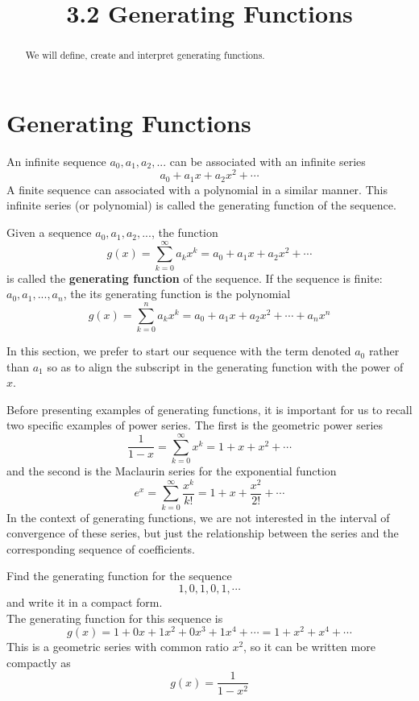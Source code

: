 \documentclass[handout]{ximera}
\title{3.2 Generating Functions}
\begin{document}
\begin{abstract}
We will define, create and interpret generating functions.
\end{abstract}

\maketitle

\section{Generating Functions}

An infinite sequence $a_0, a_1, a_2, ... $ can be associated with an infinite series
\[
a_0 + a_1 x + a_2 x^2 + \cdots
\]
A finite sequence can associated with a polynomial in a similar manner.
This infinite series (or polynomial) is called the generating function of the sequence.
\begin{definition}
Given a sequence $a_0, a_1, a_2, ...$, the function 
\[
g(x) = \sum_{k=0}^\infty a_kx^k = a_0 + a_1 x + a_2 x^2 + \cdots
\]
is called the \textbf{generating function} of the sequence.
If the sequence is finite: $a_0, a_1, ..., a_n$, the its generating function is the polynomial
\[
g(x) = \sum_{k=0}^n a_kx^k = a_0 + a_1 x + a_2 x^2 + \cdots + a_n x^n
\]
\end{definition}

\begin{remark}
In this section, we prefer to start our sequence with the term denoted $a_0$ rather than $a_1$ so as to 
align the subscript in the generating function with the power of $x$.
\end{remark}

Before presenting examples of generating functions, it is important for us to recall two specific examples of power series.
The first is the geometric power series
\[
\frac{1}{1-x} = \sum_{k=0}^\infty x^k = 1 + x + x^2 + \cdots
\]
and the second is the Maclaurin series for the exponential function
\[
e^x =  \sum_{k=0}^\infty \frac{x^k}{k!} = 1 + x + \frac{x^2}{2!} + \cdots
\]
In the context of generating functions, we are not interested in the interval of convergence of these series, 
but just the relationship between
the series and the corresponding sequence of coefficients.

\begin{example}[example 1]
Find the generating function for the sequence 
\[
1, 0, 1, 0, 1, \cdots
\]
and write it in a compact form.\\
The generating function for this sequence is 
\[
g(x) = 1 + 0x + 1x^2 + 0x^3 + 1x^4 + \cdots = 1 + x^2 + x^4 + \cdots
\]
This is a geometric series with common ratio $x^2$, so it can be written more compactly as
\[
g(x) = \frac{1}{1 - x^2}
\]
\end{example}
\end{document}
